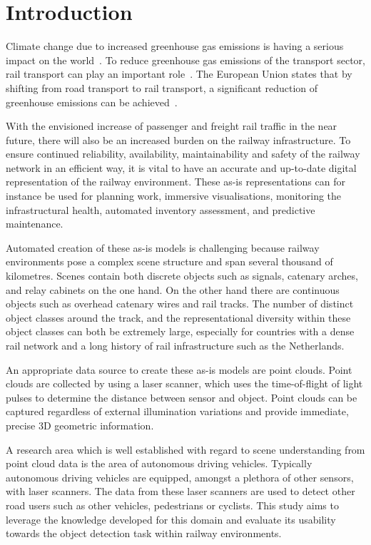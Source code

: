 \newcommand{\xyplane}{$xy$-plane}

\section{Introduction}
Climate change due to increased greenhouse gas emissions is having a serious impact on the world~\cite{Easterling2000}. To reduce greenhouse gas emissions of the transport sector, rail transport can play an important role~\cite{e7rail}. The European Union states that by shifting from road transport to rail transport, a significant reduction of greenhouse emissions can be achieved~\cite{term20}.

With the envisioned increase of passenger and freight rail traffic in the near future, there will also be an increased burden on the railway infrastructure. To ensure continued reliability, availability, maintainability and safety of the railway network in an efficient way, it is vital to have an accurate and up-to-date digital representation of the railway environment. These as-is representations can for instance be used for planning work, immersive visualisations, monitoring the infrastructural health, automated inventory assessment, and predictive maintenance. 

Automated creation of these as-is models is challenging because railway environments pose a complex scene structure and span several thousand of kilometres. Scenes contain both discrete objects such as signals, catenary arches, and relay cabinets on the one hand. On the other hand there are continuous objects such as overhead catenary wires and rail tracks. The number of distinct object classes around the track, and the representational diversity within these object classes can both be extremely large, especially for countries with a dense rail network and a long history of rail infrastructure such as the Netherlands.

An appropriate data source to create these as-is models are point clouds. Point clouds are collected by using a laser scanner, which uses the time-of-flight of light pulses to determine the distance between sensor and object. Point clouds can be captured regardless of external illumination variations and provide immediate, precise 3D geometric information.

A research area which is well established with regard to scene understanding from point cloud data is the area of autonomous driving vehicles. Typically autonomous driving vehicles are equipped, amongst a plethora of other sensors, with laser scanners. The data from these laser scanners are used to detect other road users such as other vehicles, pedestrians or cyclists. This study aims to leverage the knowledge developed for this domain and evaluate its usability towards the object detection task within railway environments.


